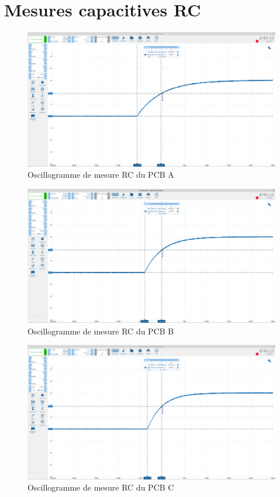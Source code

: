 \appendix

\section{Mesures capacitives RC}
\label{mesrc}
\begin{figure}[!ht]
  \includegraphics[width=16cm]{figuresMeasure/a}
  \caption{Oscillogramme de mesure RC du PCB A}
\end{figure}

\begin{figure}[!ht]
  \includegraphics[width=16cm]{figuresMeasure/b}
  \caption{Oscillogramme de mesure RC du PCB B}
\end{figure}

\newpage

\begin{figure}[!ht]
  \includegraphics[width=16cm]{figuresMeasure/c}
  \caption{Oscillogramme de mesure RC du PCB C}
\end{figure}


